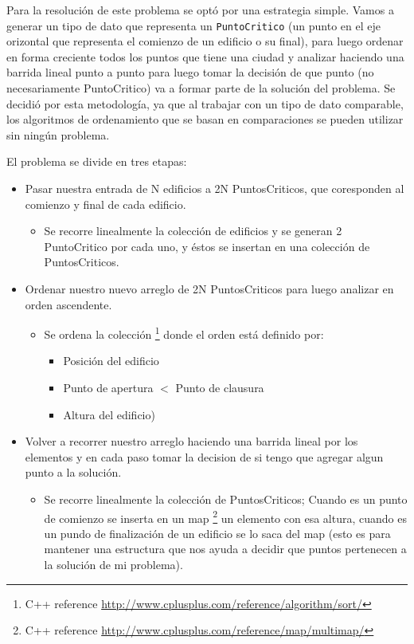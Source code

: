 Para la resolución de este problema se optó por una estrategia simple. Vamos a generar un tipo de dato que representa un \texttt{PuntoCritico} (un punto en el eje orizontal que representa el comienzo de un edificio o su final), para luego ordenar en forma creciente todos los puntos que tiene una ciudad y analizar haciendo una barrida lineal punto a punto para luego tomar la decisi\'on de que punto (no necesariamente PuntoCritico) va a formar parte de la solución del problema.
Se decidió por esta metodología, ya que al trabajar con un tipo de dato comparable, los algoritmos de ordenamiento que se basan en comparaciones se pueden utilizar sin ningún problema.

El problema se divide en tres etapas:

\begin{itemize}
	\item Pasar nuestra entrada de N edificios a 2N PuntosCriticos, que coresponden al comienzo y final de cada edificio.
		\begin{itemize}
		\item  Se recorre linealmente la colección de edificios y se generan 2 PuntoCritico por cada uno, y \'estos se insertan en una colección de PuntosCriticos.
		\end{itemize}
	\item Ordenar nuestro nuevo arreglo de 2N PuntosCriticos para luego analizar en orden ascendente.
		\begin{itemize}
		\item  Se ordena la colecci\'on \footnote{C++ reference \url{http://www.cplusplus.com/reference/algorithm/sort/}} donde el orden está definido por:  
			\begin{itemize}
				\item Posici\'on del edificio
				\item Punto de apertura $<$ Punto de clausura
				\item Altura del edificio)
			\end{itemize}
		\end{itemize}
	\item Volver a recorrer nuestro arreglo haciendo una barrida lineal por los elementos y en cada paso tomar la decision de si tengo que agregar algun punto a la soluci\'on.
	\begin{itemize}
		\item  Se recorre linealmente la colección de PuntosCriticos; Cuando es un punto de comienzo se inserta en un map 
		\footnote{C++ reference \url{http://www.cplusplus.com/reference/map/multimap/}}  un elemento con esa altura, cuando es un pundo de finalizaci\'on de un edificio se lo saca del map (esto es para mantener una estructura que nos ayuda a decidir que puntos pertenecen a la soluci\'on de mi problema).
		\end{itemize}
\end{itemize}



